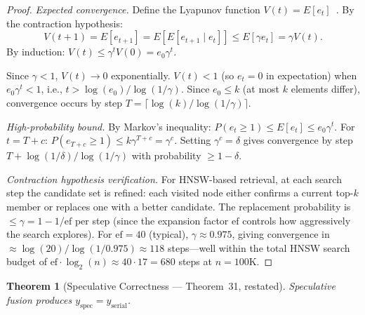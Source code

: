 \documentclass{article}
\newtheorem{theorem}{Theorem}
\theoremstyle{definition}
\theoremstyle{remark}
\newcommand{\ceil}[1]{\lceil #1 \rceil}
\begin{document}
\begin{proof}
\emph{Expected convergence.}
Define the Lyapunov function $V(t) = E[e_t]$~\cite{lyapunov1992general}. By the contraction hypothesis:
\[
  V(t+1) = E[e_{t+1}] = E[E[e_{t+1} \mid e_t]] \leq E[\gamma e_t] = \gamma V(t).
\]
By induction: $V(t) \leq \gamma^t V(0) = e_0 \gamma^t$.

Since $\gamma < 1$, $V(t) \to 0$ exponentially. $V(t) < 1$ (so $e_t = 0$ in expectation) when $e_0 \gamma^t < 1$, i.e., $t > \log(e_0)/\log(1/\gamma)$. Since $e_0 \leq k$ (at most $k$ elements differ), convergence occurs by step $T = \ceil{\log(k)/\log(1/\gamma)}$.

\emph{High-probability bound.}
By Markov's inequality: $P(e_t \geq 1) \leq E[e_t] \leq e_0 \gamma^t$. For $t = T + c$: $P(e_{T+c} \geq 1) \leq k \gamma^{T+c} = \gamma^c$. Setting $\gamma^c = \delta$ gives convergence by step $T + \log(1/\delta)/\log(1/\gamma)$ with probability $\geq 1-\delta$.

\emph{Contraction hypothesis verification.}
For HNSW-based retrieval, at each search step the candidate set is refined: each visited node either confirms a current top-$k$ member or replaces one with a better candidate. The replacement probability is $\leq \gamma = 1 - 1/\mathrm{ef}$ per step (since the expansion factor $\mathrm{ef}$ controls how aggressively the search explores). For $\mathrm{ef} = 40$ (typical), $\gamma \approx 0.975$, giving convergence in $\approx \log(20)/\log(1/0.975) \approx 118$ steps---well within the total HNSW search budget of $\mathrm{ef} \cdot \log_2(n) \approx 40 \cdot 17 = 680$ steps at $n = 100$K.
\end{proof}

\begin{theorem}[Speculative Correctness --- Theorem~31, restated]\label{thm:spec-correct-app}
Speculative fusion produces $y_{\mathrm{spec}} = y_{\mathrm{serial}}$.
\end{theorem}
\end{document}
